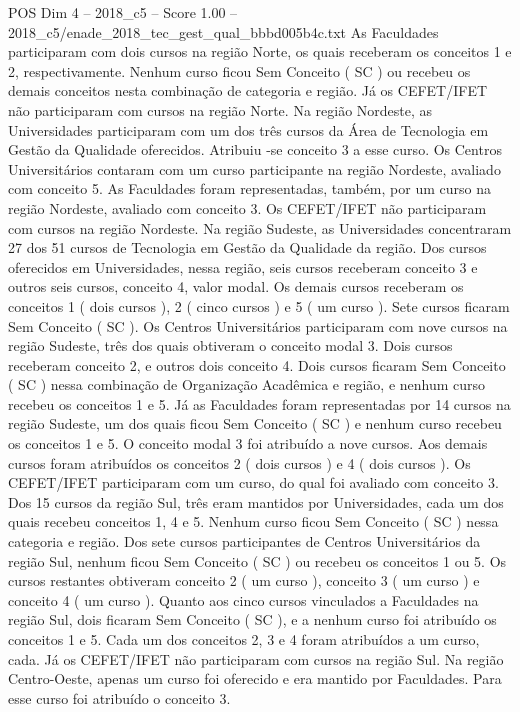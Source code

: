 \begin{textsample}{POS Dim 4 – 2018\_c5 – Score 1.00 – 2018\_c5/enade\_2018\_tec\_gest\_qual\_bbbd005b4c.txt}
As Faculdades participaram com dois cursos na região Norte, os quais receberam os conceitos 1 e 2, respectivamente.
Nenhum curso ficou Sem Conceito ( SC ) ou recebeu os demais conceitos nesta combinação de categoria e região.
Já os CEFET/IFET não participaram com cursos na região Norte.
Na região Nordeste, as Universidades participaram com um dos três cursos da Área de Tecnologia em Gestão da Qualidade oferecidos.
Atribuiu -se conceito 3 a esse curso.
Os Centros Universitários contaram com um curso participante na região Nordeste, avaliado com conceito 5.
As Faculdades foram representadas, também, por um curso na região Nordeste, avaliado com conceito 3.
Os CEFET/IFET não participaram com cursos na região Nordeste.
Na região Sudeste, as Universidades concentraram 27 dos 51 cursos de Tecnologia em Gestão da Qualidade da região.
Dos cursos oferecidos em Universidades, nessa região, seis cursos receberam conceito 3 e outros seis cursos, conceito 4, valor modal.
Os demais cursos receberam os conceitos 1 ( dois cursos ), 2 ( cinco cursos ) e 5 ( um curso ).
Sete cursos ficaram Sem Conceito ( SC ).
Os Centros Universitários participaram com nove cursos na região Sudeste, três dos quais obtiveram o conceito modal 3.
Dois cursos receberam conceito 2, e outros dois conceito 4.
Dois cursos ficaram Sem Conceito ( SC ) nessa combinação de Organização Acadêmica e região, e nenhum curso recebeu os conceitos 1 e 5.
Já as Faculdades foram representadas por 14 cursos na região Sudeste, um dos quais ficou Sem Conceito ( SC ) e nenhum curso recebeu os conceitos 1 e 5.
O conceito modal 3 foi atribuído a nove cursos.
Aos demais cursos foram atribuídos os conceitos 2 ( dois cursos ) e 4 ( dois cursos ).
Os CEFET/IFET participaram com um curso, do qual foi avaliado com conceito 3.
Dos 15 cursos da região Sul, três eram mantidos por Universidades, cada um dos quais recebeu conceitos 1, 4 e 5.
Nenhum curso ficou Sem Conceito ( SC ) nessa categoria e região.
Dos sete cursos participantes de Centros Universitários da região Sul, nenhum ficou Sem Conceito ( SC ) ou recebeu os conceitos 1 ou 5.
Os cursos restantes obtiveram conceito 2 ( um curso ), conceito 3 ( um curso ) e conceito 4 ( um curso ).
Quanto aos cinco cursos vinculados a Faculdades na região Sul, dois ficaram Sem Conceito ( SC ), e a nenhum curso foi atribuído os conceitos 1 e 5.
Cada um dos conceitos 2, 3 e 4 foram atribuídos a um curso, cada.
Já os CEFET/IFET não participaram com cursos na região Sul.
Na região Centro-Oeste, apenas um curso foi oferecido e era mantido por Faculdades.
Para esse curso foi atribuído o conceito 3.

\end{textsample}
